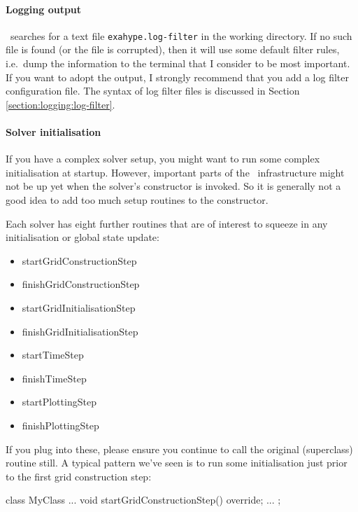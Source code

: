 \paragraph{Logging output}

\ExaHyPE\ searches for a text file \texttt{exahype.log-filter} in the working
directory.
If no such file is found (or the file is corrupted), then it will use some
default filter rules, i.e.~dump the information to the terminal that I consider
to be most important.
If you want to adopt the output, I strongly recommend that you add a log filter
configuration file. 
The syntax of log filter files is discussed in Section
\ref{section:logging:log-filter}.


\paragraph{Solver initialisation}

If you have a complex solver setup, you might want to run some complex
initialisation at startup.
However, important parts of the \ExaHyPE\ infrastructure might not be up yet
when the solver's constructor is invoked.
So it is generally not a good idea to add too much setup routines to the
constructor.


Each solver has eight further routines that are of interest to squeeze in any
initialisation or global state update:

\begin{itemize}
  \item startGridConstructionStep
  \item finishGridConstructionStep
  \item startGridInitialisationStep
  \item finishGridInitialisationStep
  \item startTimeStep
  \item finishTimeStep
  \item startPlottingStep
  \item finishPlottingStep   
\end{itemize}


\noindent
If you plug into these, please ensure you continue to call the original
(superclass) routine still.
A typical pattern we've seen is to run some initialisation just prior to the
first grid construction step:

\begin{code}
class MyClass ... {
  void startGridConstructionStep() override;
  ...
};
\end{code}



